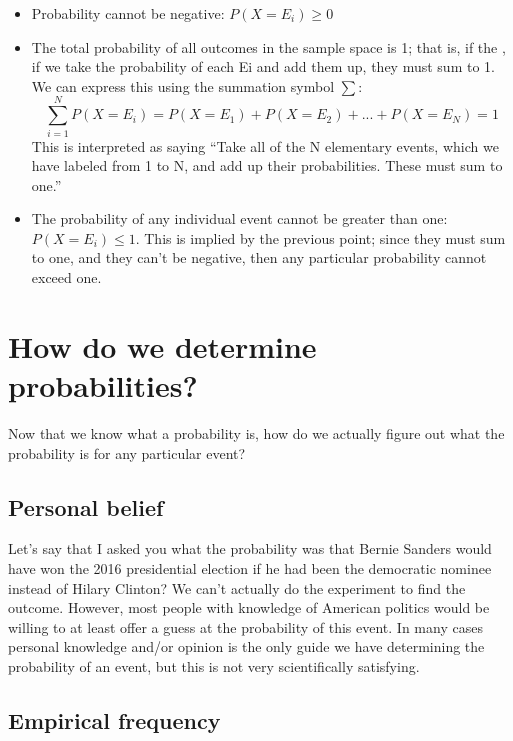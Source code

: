 \documentclass[12pt,]{book}
\providecommand{\tightlist}{%
  \setlength{\itemsep}{0pt}\setlength{\parskip}{0pt}}
\theoremstyle{definition}
\theoremstyle{definition}
\theoremstyle{definition}
\theoremstyle{remark}
\begin{document}
\begin{itemize}
\tightlist
\item
  Probability cannot be negative: \(P(X=E_i) \ge 0\)
\item
  The total probability of all outcomes in the sample space is 1; that is, if the , if we take the probability of each Ei and add them up, they must sum to 1. We can express this using the summation symbol \(\sum\):
  \[
  \sum_{i=1}^N{P(X=E_i)} = P(X=E_1) + P(X=E_2) + ... + P(X=E_N) = 1
  \]
  This is interpreted as saying ``Take all of the N elementary events, which we have labeled from 1 to N, and add up their probabilities. These must sum to one.''\\
\item
  The probability of any individual event cannot be greater than one: \(P(X=E_i)\le 1\). This is implied by the previous point; since they must sum to one, and they can't be negative, then any particular probability cannot exceed one.
\end{itemize}

\hypertarget{how-do-we-determine-probabilities}{%
\section{How do we determine probabilities?}\label{how-do-we-determine-probabilities}}

Now that we know what a probability is, how do we actually figure out what the probability is for any particular event?

\hypertarget{personal-belief}{%
\subsection{Personal belief}\label{personal-belief}}

Let's say that I asked you what the probability was that Bernie Sanders would have won the 2016 presidential election if he had been the democratic nominee instead of Hilary Clinton? We can't actually do the experiment to find the outcome. However, most people with knowledge of American politics would be willing to at least offer a guess at the probability of this event. In many cases personal knowledge and/or opinion is the only guide we have determining the probability of an event, but this is not very scientifically satisfying.

\hypertarget{empirical-frequency}{%
\subsection{Empirical frequency}\label{empirical-frequency}}
\end{document}
